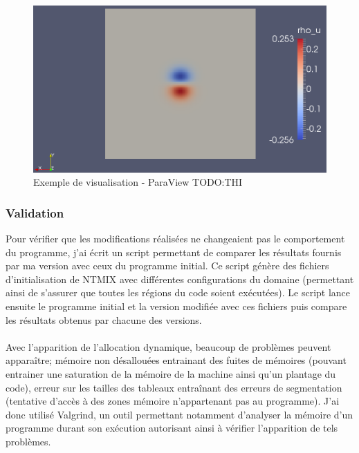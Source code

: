 \begin{figure}[ht]
  \centering
  \includegraphics[scale=0.3]{figures/vertex.png}
  \caption{\label{fig:visu}Exemple de visualisation - ParaView TODO:THI}
\end{figure}



\subsubsection{Validation}
Pour vérifier que les modifications réalisées ne changeaient pas le comportement du programme, j'ai écrit un script permettant de comparer les résultats fournis par ma version avec ceux du programme initial. Ce script génère des fichiers d'initialisation de NTMIX avec différentes configurations du domaine (permettant ainsi de s'assurer que toutes les régions du code soient exécutées). Le script lance ensuite le programme initial et la version modifiée avec ces fichiers puis compare les résultats obtenus par chacune des versions.


\paragraph{}Avec l'apparition de l'allocation dynamique, beaucoup de problèmes peuvent apparaître; mémoire non désallouées entrainant des fuites de mémoires (pouvant entrainer une saturation de la mémoire de la machine ainsi qu'un plantage du code), erreur sur les tailles des tableaux entraînant des erreurs de segmentation (tentative d'accès à des zones mémoire n'appartenant pas au programme).
J'ai donc utilisé Valgrind, un outil permettant notamment d'analyser la mémoire d'un programme durant son exécution autorisant ainsi à vérifier l'apparition de tels problèmes.




